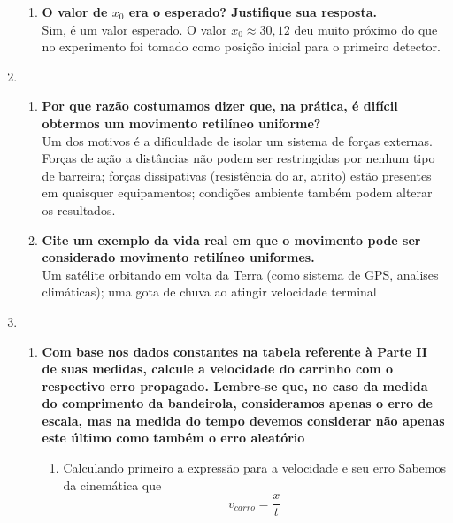 \begin{enumerate}
\begin{enumerate}
        \item \textbf{O valor de $x_0$ era o esperado? Justifique sua resposta.}\\
        Sim, é um valor esperado. O valor $x_0 \approx 30,12$ deu muito próximo do que no experimento foi tomado como posição inicial para o primeiro detector.
    \end{enumerate}

    \item
    \begin{enumerate}
        \item \textbf{Por que razão costumamos dizer que, na prática, é difícil obtermos um movimento retilíneo uniforme?} \\
        Um dos motivos é a dificuldade de isolar um sistema de forças externas. Forças de ação a distâncias não podem ser restringidas por nenhum tipo de barreira; forças dissipativas (resistência do ar, atrito) estão presentes em quaisquer equipamentos; condições ambiente também podem alterar os resultados.
        

        \item \textbf{Cite um exemplo da vida real em que o movimento pode ser considerado movimento retilíneo uniformes.}\\
        Um satélite orbitando em volta da Terra (como sistema de GPS, analises climáticas); uma gota de chuva ao atingir velocidade terminal
    \end{enumerate}

    \item 
    \begin{enumerate}
        \item \textbf{Com base nos dados constantes na tabela referente à Parte II de suas medidas, calcule a velocidade do carrinho com o respectivo erro propagado. Lembre-se que, no caso da medida do comprimento da bandeirola, consideramos apenas o erro de escala, mas na medida do tempo devemos considerar não apenas este último como também o erro aleatório} \\

        \begin{enumerate}
            \item Calculando primeiro a expressão para a velocidade e seu erro
            Sabemos da cinemática que
            \begin{equation} \label{eq: v_med}
                v_{carro} = \frac{x}{t}
            \end{equation}
    

\end{enumerate}
\end{enumerate}
\end{enumerate}
